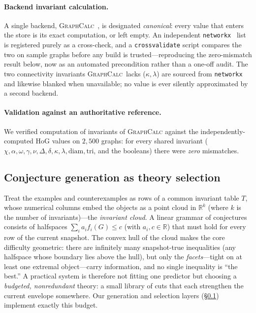 \documentclass[]{ceurart}
\begin{document}
\paragraph{Backend invariant calculation.} A single backend,
\textsc{GraphCalc}~\cite{davila2025graphcalc}, is designated \emph{canonical}:
every value that enters the store is its exact computation, or left empty. An
independent \texttt{networkx}~\cite{hagberg2008networkx} list is registered purely as a cross-check, and
a \texttt{crossvalidate} script compares the two on sample graphs before any build is
trusted---reproducing the zero-mismatch result below, now as an automated
precondition rather than a one-off audit. The two connectivity invariants
\textsc{GraphCalc}~lacks ($\kappa,\lambda$) are sourced from \texttt{networkx}
and likewise blanked when unavailable; no value is ever silently approximated by
a second backend.

\paragraph{Validation against an authoritative reference.} We verified computation of invariants of \textsc{GraphCalc} against the independently-computed HoG values on $2{,}500$
graphs: for every shared invariant
($\chi,\alpha,\omega,\gamma,\nu,\Delta,\delta,\kappa,\lambda,\mathrm{diam},
\mathrm{tri}$, and the booleans) there were \emph{zero} mismatches.

\subsection{Conjecture generation as theory selection}
\label{sec:theory-selection}
Treat the examples and counterexamples as rows of a common invariant table $T$,
whose numerical columns embed the objects as a point cloud in $\mathbb{R}^k$ (where $k$ is the number of invariants)---the
\emph{invariant cloud}. A linear grammar of conjectures consists of halfspaces
$\sum_i a_i f_i(G)\le c$ (with $a_i, c \in \mathbb{R}$) that must hold for every row of the current snapshot.
The convex hull of the cloud makes the core difficulty geometric: there are
infinitely many snapshot-true inequalities (any halfspace whose boundary lies
above the hull), but only the \emph{facets}---tight on at least one extremal
object---carry information, and no single inequality is ``the best.'' A practical
system is therefore not fitting one predictor but choosing a \emph{budgeted,
nonredundant} theory: a small library of cuts that each strengthen the current
envelope somewhere. Our generation and selection layers (\S\ref{sec:theory-selection})
implement exactly this budget. 
\end{document}
